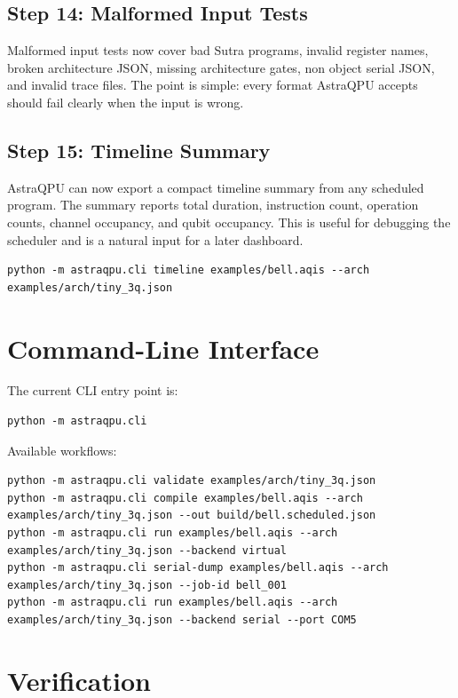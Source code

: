 \documentclass[11pt,a4paper]{article}
\begin{document}
\subsection{Step 14: Malformed Input Tests}

Malformed input tests now cover bad Sutra programs, invalid register names, broken architecture JSON, missing architecture gates, non object serial JSON, and invalid trace files. The point is simple: every format AstraQPU accepts should fail clearly when the input is wrong.

\subsection{Step 15: Timeline Summary}

AstraQPU can now export a compact timeline summary from any scheduled program. The summary reports total duration, instruction count, operation counts, channel occupancy, and qubit occupancy. This is useful for debugging the scheduler and is a natural input for a later dashboard.

\begin{lstlisting}[style=astra]
python -m astraqpu.cli timeline examples/bell.aqis --arch examples/arch/tiny_3q.json
\end{lstlisting}

\section{Command-Line Interface}

The current CLI entry point is:

\begin{lstlisting}[style=astra]
python -m astraqpu.cli
\end{lstlisting}

Available workflows:

\begin{lstlisting}[style=astra]
python -m astraqpu.cli validate examples/arch/tiny_3q.json
python -m astraqpu.cli compile examples/bell.aqis --arch examples/arch/tiny_3q.json --out build/bell.scheduled.json
python -m astraqpu.cli run examples/bell.aqis --arch examples/arch/tiny_3q.json --backend virtual
python -m astraqpu.cli serial-dump examples/bell.aqis --arch examples/arch/tiny_3q.json --job-id bell_001
python -m astraqpu.cli run examples/bell.aqis --arch examples/arch/tiny_3q.json --backend serial --port COM5
\end{lstlisting}

\section{Verification}
\end{document}
